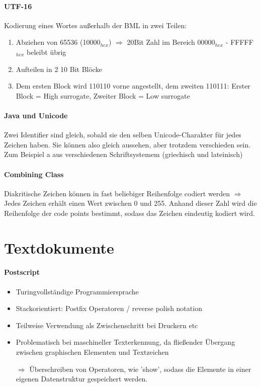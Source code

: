 \documentclass{article}
\begin{document}
\paragraph{UTF-16}
Kodierung eines Wortes außerhalb der BML in zwei Teilen:
\begin{enumerate}
\item Abziehen von 65536 (10000$_{hex}$) $\Rightarrow$ 20Bit Zahl im Bereich 00000$_{hex}$ - FFFFF$_{hex}$ beleibt übrig
\item Aufteilen in 2 10 Bit Blöcke
\item Dem ersten Block wird 110110 vorne angestellt, dem zweiten 110111: Erster Block = High surrogate, Zweiter Block = Low surrogate
\end{enumerate}

\paragraph{Java und Unicode}
Zwei Identifier sind gleich, sobald sie den selben Unicode-Charakter für jedes Zeichen haben. Sie können also gleich aussehen, aber trotzdem verschieden sein. Zum Beispiel a aus verschiedenen Schriftsystemem (griechisch und lateinisch)

\paragraph{Combining Class}
Diakritische Zeichen können in fast beliebiger Reihenfolge codiert werden $\Rightarrow$ Jedes Zeichen erhält einen Wert zwischen 0 und 255. Anhand dieser Zahl wird die Reihenfolge der code points bestimmt, sodass das Zeichen eindeutig kodiert wird.


\newpage
\section{Textdokumente}

\paragraph{Postscript}
\begin{itemize}
\item Turingvollständige Programmiersprache
\item Stackorientiert: Postfix Operatoren / reverse polish notation
\item Teilweise Verwendung als Zwischenschritt bei Druckern etc
\item Problematisch bei maschineller Texterkennung, da fließender Übergang zwischen graphischen Elementen und Textzeichen
\item[$\Rightarrow$] Überschreiben von Operatoren, wie 'show', sodass die Elemente in einer eigenen Datenstruktur gespeichert werden.
\end{itemize}
\end{document}
